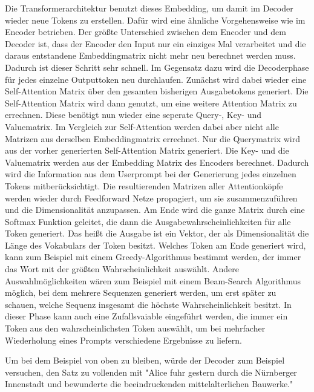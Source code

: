 Die Transformerarchitektur benutzt dieses Embedding, um damit im Decoder wieder neue Tokens zu erstellen.
Dafür wird eine ähnliche Vorgehensweise wie im Encoder betrieben.
Der größte Unterschied zwischen dem Encoder und dem Decoder ist, dass der Encoder den Input nur ein einziges Mal verarbeitet und die daraus entstandene Embeddingmatrix nicht mehr neu berechnet werden muss.
Dadurch ist dieser Schritt sehr schnell.
Im Gegensatz dazu wird die Decoderphase für jedes einzelne Outputtoken neu durchlaufen.
Zunächst wird dabei wieder eine Self-Attention Matrix über den gesamten bisherigen Ausgabetokens generiert.
Die Self-Attention Matrix wird dann genutzt, um eine weitere Attention Matrix zu errechnen.
Diese benötigt nun wieder eine seperate Query-, Key- und Valuematrix.
Im Vergleich zur Self-Attention werden dabei aber nicht alle Matrizen aus derselben Embeddingmatrix errechnet.
Nur die Querymatrix wird aus der vorher generierten Self-Attention Matrix generiert.
Die Key- und die Valuematrix werden aus der Embedding Matrix des Encoders berechnet. 
Dadurch wird die Information aus dem Userprompt bei der Generierung jedes einzelnen Tokens mitberücksichtigt. 
Die resultierenden Matrizen aller Attentionköpfe werden wieder durch Feedforward Netze propagiert, um sie zusammenzuführen und die Dimensionalität anzupassen.
Am Ende wird die ganze Matrix durch eine Softmax Funktion geleitet, die dann die Ausgabewahrscheinlichkeiten für alle Token generiert.
Das heißt die Ausgabe ist ein Vektor, der als Dimensionalität die Länge des Vokabulars der Token besitzt.
Welches Token am Ende generiert wird, kann zum Beispiel mit einem Greedy-Algorithmus bestimmt werden, der immer das Wort mit der größten Wahrscheinlichkeit auswählt.
Andere Auswahlmöglichkeiten wären zum Beispiel mit einem Beam-Search Algorithmus möglich, bei dem mehrere Sequenzen generiert werden, um erst später zu schauen, welche Sequenz insgesamt die höchste Wahrscheinlichkeit besitzt.
In dieser Phase kann auch eine Zufallsvaiable eingeführt werden, die immer ein Token aus den wahrscheinlichsten Token auswählt, um bei mehrfacher Wiederholung eines Prompts verschiedene Ergebnisse zu liefern.

Um bei dem Beispiel von oben zu bleiben, würde der Decoder zum Beispiel versuchen, den Satz zu vollenden mit  "Alice fuhr gestern durch die Nürnberger Innenstadt und bewunderte die beeindruckenden mittelalterlichen Bauwerke."
\cite{vaswani2023}

